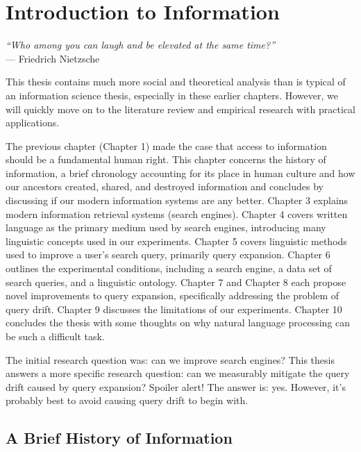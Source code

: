 \chapter{Introduction to Information}


\begin{flushright}
    \textit{``Who among you can laugh and be elevated at the same time?''}
    \\ --- Friedrich Nietzsche
\end{flushright}

This thesis contains much more social and theoretical analysis than is typical of an information science thesis, especially in these earlier chapters. However, we will quickly move on to the literature review and empirical research with practical applications.

The previous chapter (Chapter 1) made the case that access to information should be a fundamental human right. This chapter concerns the history of information, a brief chronology accounting for its place in human culture and how our ancestors created, shared, and destroyed information and concludes by discussing if our modern information systems are any better. Chapter 3 explains modern information retrieval systems (search engines). Chapter 4 covers written language as the primary medium used by search engines, introducing many linguistic concepts used in our experiments. Chapter 5 covers linguistic methods used to improve a user’s search query, primarily query expansion. Chapter 6 outlines the experimental conditions, including a search engine, a data set of search queries, and a linguistic ontology. Chapter 7 and Chapter 8 each propose novel improvements to query expansion, specifically addressing the problem of query drift. Chapter 9 discusses the limitations of our experiments. Chapter 10 concludes the thesis with some thoughts on why natural language processing can be such a difficult task.

The initial research question was: can we improve search engines? This thesis answers a more specific research question: can we measurably mitigate the query drift caused by query expansion? Spoiler alert! The answer is: yes. However, it’s probably best to avoid causing query drift to begin with.

\section{A Brief History of Information}

